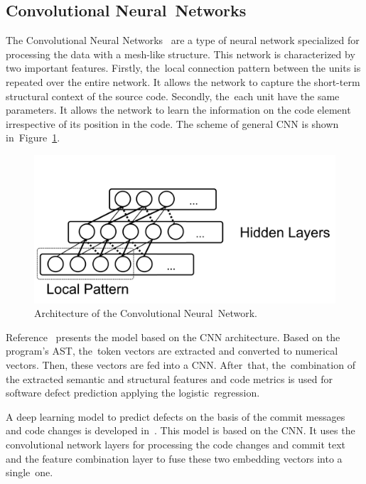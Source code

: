 \documentclass[mathematics,review,accept,moreauthors,pdftex]{Definitions/mdpi}
\begin{document}
\subsection{Convolutional Neural~Networks}

The Convolutional Neural Networks~\cite{Goodfellow-et-al-2016} are a type of neural network specialized for processing the data with a mesh-like structure. This network is characterized by two important features. Firstly, the~local connection pattern between the units is repeated over the entire network. It allows the network to capture the short-term structural context of the source code. Secondly, the~each unit have the same parameters. It allows the network to learn the information on the code element irrespective of its position in the code.
The scheme of general CNN is shown in~Figure~\ref{fig4}.

\begin{figure}[H] %
\includegraphics[width=10.5 cm]{f4.png}
\caption{Architecture of the Convolutional Neural~Network.}
\label{fig4} %
\end{figure}

Reference~\cite{LiEtAl2017} presents the model based on the CNN architecture. Based on the program's AST, the~token vectors are extracted and converted to numerical vectors. Then, these vectors are fed into a CNN. After~that, the~combination of the extracted semantic and structural features and code metrics is used for software defect prediction applying the logistic~regression.

A deep learning model to predict defects on the basis of the commit messages and code changes is developed in~\cite{HoangEtAl2019}. This model is based on the CNN. It uses the convolutional network layers for processing the code changes and commit text and the feature combination layer to fuse these two embedding vectors into a single~one.
\end{document}
